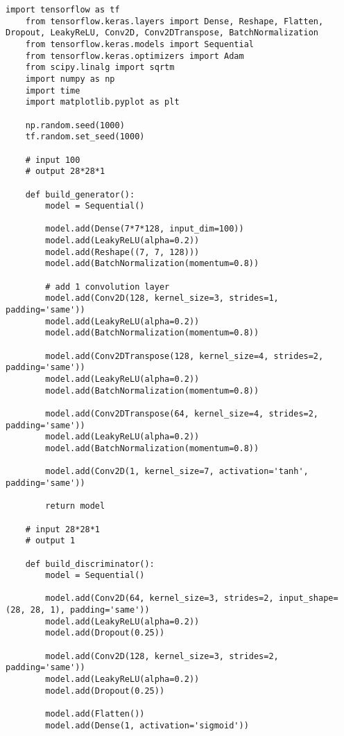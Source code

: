 \begin{lstlisting}[style=mypython, caption= Explore GAN with more convolutional layers 1]
    import tensorflow as tf
    from tensorflow.keras.layers import Dense, Reshape, Flatten, Dropout, LeakyReLU, Conv2D, Conv2DTranspose, BatchNormalization
    from tensorflow.keras.models import Sequential
    from tensorflow.keras.optimizers import Adam
    from scipy.linalg import sqrtm
    import numpy as np
    import time
    import matplotlib.pyplot as plt
    
    np.random.seed(1000)
    tf.random.set_seed(1000)
    
    # input 100
    # output 28*28*1
    
    def build_generator():
        model = Sequential()
        
        model.add(Dense(7*7*128, input_dim=100))
        model.add(LeakyReLU(alpha=0.2))
        model.add(Reshape((7, 7, 128)))
        model.add(BatchNormalization(momentum=0.8))
    
        # add 1 convolution layer
        model.add(Conv2D(128, kernel_size=3, strides=1, padding='same'))
        model.add(LeakyReLU(alpha=0.2))
        model.add(BatchNormalization(momentum=0.8))
    
        model.add(Conv2DTranspose(128, kernel_size=4, strides=2, padding='same'))
        model.add(LeakyReLU(alpha=0.2))
        model.add(BatchNormalization(momentum=0.8))
    
        model.add(Conv2DTranspose(64, kernel_size=4, strides=2, padding='same'))
        model.add(LeakyReLU(alpha=0.2))
        model.add(BatchNormalization(momentum=0.8))
    
        model.add(Conv2D(1, kernel_size=7, activation='tanh', padding='same'))
    
        return model
    
    # input 28*28*1
    # output 1
    
    def build_discriminator():
        model = Sequential()
        
        model.add(Conv2D(64, kernel_size=3, strides=2, input_shape=(28, 28, 1), padding='same'))
        model.add(LeakyReLU(alpha=0.2))
        model.add(Dropout(0.25))
    
        model.add(Conv2D(128, kernel_size=3, strides=2, padding='same'))
        model.add(LeakyReLU(alpha=0.2))
        model.add(Dropout(0.25))
    
        model.add(Flatten())
        model.add(Dense(1, activation='sigmoid'))
    

\end{lstlisting}
